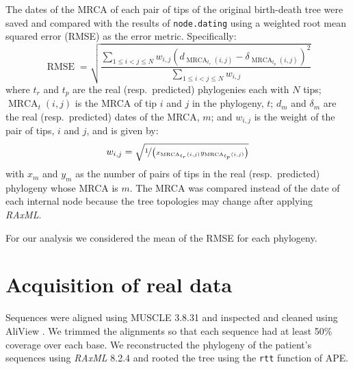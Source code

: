 \documentclass[12pt]{article}
\newcommand{\code}[1]{{\tt #1}}
\begin{document}
The dates of the MRCA of each pair of tips of the original birth-death tree were saved and compared with the results of \code{node.dating} using a weighted root mean squared error (RMSE) as the error metric.
Specifically:
\[\operatorname{RMSE} = \sqrt{\frac{\sum_{1 \leq i < j \leq N}w_{i,j}\left(d_{\operatorname{MRCA}_{t_r}(i,j)} - \delta_{\operatorname{MRCA}_{t_p}(i,j)}\right)^2}{\sum_{1 \leq i < j \leq N}w_{i,j}}}\]
where $t_r$ and $t_p$ are the real (resp.~predicted) phylogenies each with $N$ tips; $\operatorname{MRCA}_t(i, j)$ is the MRCA of tip $i$ and $j$ in the phylogeny, $t$; $d_{m}$ and $\delta_m$ are the real (resp.~predicted) dates of the MRCA, $m$; and $w_{i, j}$ is the weight of the pair of tips, $i$ and $j$, and is given by:
\[w_{i, j} = \sqrt{\nicefrac{1}{\left(x_{\operatorname{MRCA}_{t_r}(i,j)}y_{\operatorname{MRCA}_{t_p}(i,j)}\right)}}\]
with $x_m$ and $y_m$ as the number of pairs of tips in the real (resp.~predicted) phylogeny whose MRCA is $m$.
The MRCA was compared instead of the date of each internal node because the tree topologies may change after applying \emph{RAxML}.

For our analysis we considered the mean of the RMSE for each phylogeny.

\section{Acquisition of real data}
Sequences were aligned using MUSCLE 3.8.31 \citep{Muscle04} and inspected and cleaned using AliView \citep{AliView14}. 
We trimmed the alignments so that each sequence had at least 50\% coverage over each base.
We reconstructed the phylogeny of the patient's sequences using \emph{RAxML} 8.2.4 \citep{Raxml14} and rooted the tree using the \code{rtt} function of APE.



\end{document}
